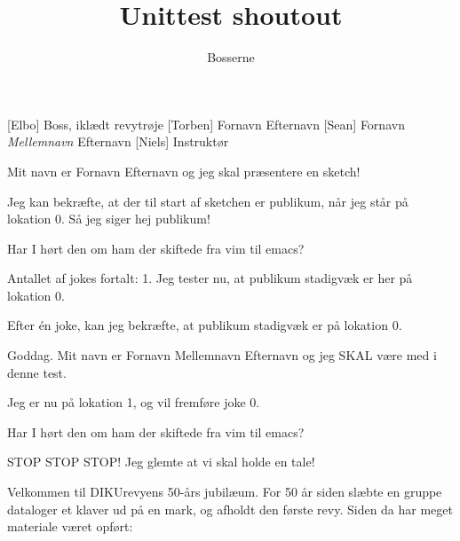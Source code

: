 \documentclass[a4paper,11pt]{article}
\title{Unittest shoutout}
\author{Bosserne}
\begin{document}
\maketitle

\begin{roles}
[Elbo] Boss, iklædt revytrøje
[Torben] Fornavn Efternavn
[Sean] Fornavn \emph{Mellemnavn} Efternavn
[Niels] Instruktør
\end{roles}

\begin{sketch}


 Mit navn er Fornavn Efternavn og jeg skal præsentere en sketch!

 Jeg kan bekræfte, at der til start af sketchen er publikum, når jeg står på lokation 0. Så jeg siger hej publikum!

 Har I hørt den om ham der skiftede fra vim til emacs?

 Antallet af jokes fortalt: 1. Jeg tester nu, at publikum stadigvæk er her på lokation 0.

 Efter én joke, kan jeg bekræfte, at publikum stadigvæk er på lokation 0.


 Goddag. Mit navn er Fornavn Mellemnavn Efternavn og jeg SKAL være med i denne test.


 Jeg er nu på lokation 1, og vil fremføre joke 0.

 Har I hørt den om ham der skiftede fra vim til emacs?



 STOP STOP STOP! Jeg glemte at vi skal holde en tale!


 Velkommen til DIKUrevyens 50-års jubilæum. For 50 år siden
    slæbte en gruppe dataloger et klaver ud på en mark, og afholdt den første
    revy. Siden da har meget materiale været opført:


\end{sketch}
\end{document}
